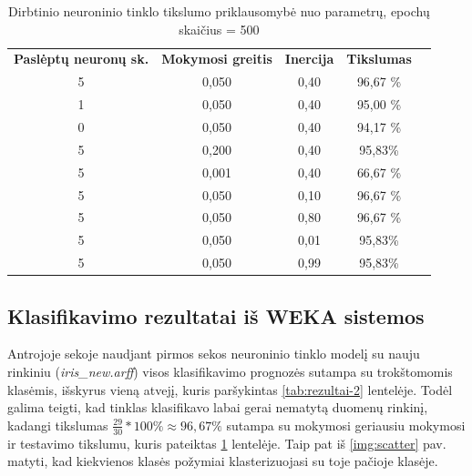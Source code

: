 \documentclass{VUMIFPSbakalaurinis}
\begin{document}
\begin{table}[]
\centering
\caption{Dirbtinio neuroninio tinklo tikslumo priklausomybė nuo parametrų, epochų skaičius = 500}{
\begin{tabular}{|c|c|c|c|l}
  \cline{1-4}
  \textbf{Paslėptų neuronų sk.} & \textbf{Mokymosi greitis} & \textbf{Inercija} & \textbf{Tikslumas} &  \\ \cline{1-4}
  5                             & 0,050                     & 0,40              & 96,67 \%           &  \\ \cline{1-4}
  1                             & 0,050                     & 0,40              & 95,00 \%           &  \\ \cline{1-4}
  0                             & 0,050                     & 0,40              & 94,17 \%           &  \\ \cline{1-4}
  5                             & 0,200                     & 0,40              & 95,83\%            &  \\ \cline{1-4}
  5                             & 0,001                     & 0,40              & 66,67 \%           &  \\ \cline{1-4}
  5                             & 0,050                     & 0,10              & 96,67 \%           &  \\ \cline{1-4}
  5                             & 0,050                     & 0,80              & 96,67 \%           &  \\ \cline{1-4}
  5                             & 0,050                     & 0,01              & 95,83\%            &  \\ \cline{1-4}
  5                             & 0,050                     & 0,99              & 95,83\%            &  \\ \cline{1-4}
\end{tabular}}
\label{tab:parametrai}
\end{table}


\subsection{Klasifikavimo rezultatai iš WEKA sistemos}
Antrojoje sekoje naudjant pirmos sekos neuroninio tinklo modelį
su nauju rinkiniu (\textit{iris\_new.arff}) visos klasifikavimo
prognozės sutampa su trokštomomis klasėmis,
išskyrus vieną atvejį, kuris paršykintas \ref{tab:rezultai-2}
lentelėje. Todėl galima teigti, kad tinklas klasifikavo 
labai gerai nematytą duomenų rinkinį, kadangi tikslumas
$\frac{29}{30} * 100 \% \approx  96,67 \%$ sutampa
su mokymosi geriausiu mokymosi ir testavimo tikslumu,
kuris pateiktas \ref{tab:parametrai} lentelėje.
Taip pat iš \ref{img:scatter} pav. matyti, kad
kiekvienos klasės požymiai klasterizuojasi su
toje pačioje klasėje.
\end{document}
